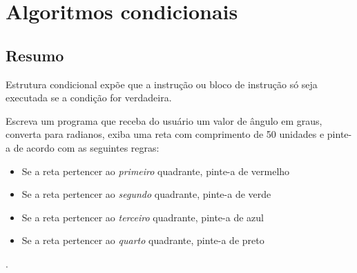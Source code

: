 \chapter[Algoritmos condicionais]
{Algoritmos condicionais}



\section{Resumo}

Estrutura condicional expõe que a instrução ou bloco de instrução só seja executada se a condição for verdadeira.


%
%







\begin{problems}
\prob
Escreva um programa que receba do usuário um valor de ângulo em graus, converta para radianos, exiba uma reta com comprimento de 50 unidades e pinte-a de acordo com as seguintes regras:
\begin{itemize}
\item
Se a reta pertencer ao \emph{primeiro} quadrante, pinte-a de vermelho
\item
Se a reta pertencer ao \emph{segundo} quadrante, pinte-a de verde
\item
Se a reta pertencer ao \emph{terceiro} quadrante, pinte-a de azul
\item
Se a reta pertencer ao \emph{quarto} quadrante, pinte-a de preto
\end{itemize}.
\label{ex:cap01_ex4}
\end{problems}

